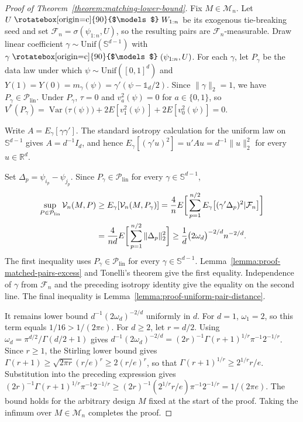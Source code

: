 \documentclass[letterpaper,12pt]{article}
\theoremstyle{definition}
\numberwithin{equation}{section}
\newcommand{\mc}{\mathcal}
\newcommand{\one}{\mathds{1}}
\newcommand{\indep}{\mathrel{\raisebox{0.05em}{\rotatebox[origin=c]{90}{$\models$}}}}
\newcommand{\Unif}{\mathrm{Unif}}
\DeclareMathOperator{\var}{Var}
\begin{document}
\begin{proof}[Proof of Theorem~\ref{theorem:matching-lower-bound}]
Fix $M\in\mathcal M_n$.
Let $U\indep W_{1:n}$ be its exogenous tie-breaking seed and set $\mathcal F_n=\sigma(\psi_{1:n},U)$, so the resulting pairs are $\mathcal F_n$-measurable.
Draw linear coefficient $\gamma\sim\Unif(\mathbb S^{d-1})$ with $\gamma \indep (\psi_{1:n},U)$.
For each $\gamma$, let $P_\gamma$ be the data law under which $\psi\sim\Unif([0,1]^d)$ and $Y(1)=Y(0)=m_\gamma(\psi)=\gamma'(\psi-\one_d/2)$.
Since $\|\gamma\|_2=1$, we have $P_\gamma\in\mathcal P_{\mathrm{lin}}$.
Under $P_\gamma$, $\tau=0$ and $v_a^2(\psi)=0$ for $a\in\{0,1\}$, so $V^*(P_\gamma)=\var\bigl(\tau(\psi)\bigr)+2E[v_1^2(\psi)]+2E[v_0^2(\psi)]=0$.

Write $A=E_\gamma[\gamma\gamma']$.
The standard isotropy calculation for the uniform law on $\mathbb S^{d-1}$ gives $A=d^{-1}I_d$, and hence $E_\gamma[(\gamma'u)^2]=u'Au=d^{-1}\|u\|_2^2$ for every $u\in\mathbb R^d$.

Set $\Delta_p=\psi_{i_p}-\psi_{j_p}$.
Since $P_\gamma\in\mathcal P_{\mathrm{lin}}$ for every $\gamma\in\mathbb S^{d-1}$,
\begin{align}
\sup_{P\in\mathcal P_{\mathrm{lin}}}\mc V_n(M,P)&\geq E_\gamma[\mc V_n(M,P_\gamma)]=\frac4nE\bigg[\sum_{p=1}^{n/2}E_\gamma\bigl[(\gamma'\Delta_p)^2|\mathcal F_n\bigr]\bigg] \notag\\
&=\frac{4}{nd}E\bigg[\sum_{p=1}^{n/2}\|\Delta_p\|_2^2\bigg]\geq\frac1d\bigl(2\omega_d\bigr)^{-2/d}n^{-2/d}. \label{equation:proof-linear-prior-bound}
\end{align}
The first inequality uses $P_\gamma\in\mathcal P_{\mathrm{lin}}$ for every $\gamma\in\mathbb S^{d-1}$.
Lemma~\ref{lemma:proof-matched-pairs-excess} and Tonelli's theorem give the first equality.
Independence of $\gamma$ from $\mathcal F_n$ and the preceding isotropy identity give the equality on the second line.
The final inequality is Lemma~\ref{lemma:proof-uniform-pair-distance}.

It remains lower bound $d^{-1} (2\omega_d)^{-2/d}$ uniformly in $d$.
For $d=1$, $\omega_1=2$, so this term equals $1/16>1/(2\pi e)$.
For $d\geq2$, let $r=d/2$.
Using $\omega_d=\pi^{d/2}/\Gamma(d/2+1)$ gives $d^{-1}(2\omega_d)^{-2/d}=(2r)^{-1}\Gamma(r+1)^{1/r}\pi^{-1}2^{-1/r}$.
Since $r\geq1$, the Stirling lower bound gives $\Gamma(r+1)\geq\sqrt{2\pi r}(r/e)^r\geq2(r/e)^r$, so that $\Gamma(r+1)^{1/r}\geq2^{1/r}r/e$.
Substitution into the preceding expression gives $(2r)^{-1}\Gamma(r+1)^{1/r}\pi^{-1}2^{-1/r}\geq(2r)^{-1}(2^{1/r}r/e)\pi^{-1}2^{-1/r}=1/(2\pi e)$.
The bound holds for the arbitrary design $M$ fixed at the start of the proof.
Taking the infimum over $M\in\mathcal M_n$ completes the proof.
\end{proof}
\end{document}
